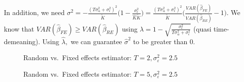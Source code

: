 In addition, we need $\sigma^2 = -\frac{(T\sigma_\alpha^2 + \sigma_\epsilon^2)^2}{\widetilde{K}} \bigg(1-\frac{\sigma_\epsilon^2}{\widehat{K}\widetilde{K}}\bigg) = \frac{(T\sigma_\alpha^2 + \sigma_\epsilon^2)^2}{\widetilde{K}} \bigg(\frac{VAR(\widehat{\beta}_{FE})}{VAR(\widehat{\beta}_{RE})}-1\bigg)$. We know that $VAR(\widehat{\beta}_{FE}) \geq VAR(\widehat{\beta}_{RE})$ using $\lambda = 1-\sqrt{\frac{\sigma_\epsilon^2}{T\sigma_\alpha^2+\sigma_\epsilon^2}}$ (quasi time-demeaning). Using $\widehat{\lambda},$ we can guarantee $\widehat{\sigma}^2$ to be greater than 0. 


\begin{figure}[h]
  \centering
  
  \caption{Random vs.\ Fixed effects estimator: $T=2, \sigma_{\varepsilon}^2 = 2.5$}
  \label{fig:REvsFE_T2}
\end{figure}

\begin{figure}[h]
  \centering
  
  \caption{Random vs.\ Fixed effects estimator: $T=5, \sigma_{\varepsilon}^2 = 2.5$}
  \label{fig:REvsFE_T5}
\end{figure}

